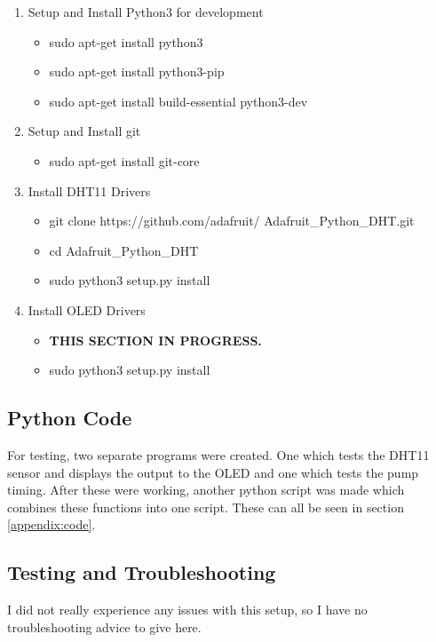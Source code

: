 \documentclass{article}
\begin{document}
\begin{multicols}{2}
		\begin{enumerate}
			\item Setup and Install Python3 for development
			\begin{itemize}
				\item sudo apt-get install python3
				\item sudo apt-get install python3-pip
				\item sudo apt-get install build-essential python3-dev
			\end{itemize}
			\item Setup and Install git
			\begin{itemize}
				\item sudo apt-get install git-core
			\end{itemize}
			\item Install DHT11 Drivers
			\begin{itemize}
				\item git clone https://github.com/adafruit/ Adafruit\_Python\_DHT.git
				\item cd Adafruit\_Python\_DHT
				\item sudo python3 setup.py install
			\end{itemize}
			\item Install OLED Drivers
			\begin{itemize}
				\item \textbf{THIS SECTION IN PROGRESS.}
				\item sudo python3 setup.py install
			\end{itemize}
		\end{enumerate}
		
		\subsection{Python Code}
		For testing, two separate programs were created. One which tests the DHT11 sensor and displays the output to the OLED and one which tests the pump timing. After these were working, another python script was made which combines these functions into one script. These can all be seen in section \ref{appendix:code}.
		
		\subsection{Testing and Troubleshooting}
		I did not really experience any issues with this setup, so I have no troubleshooting advice to give here.
		

\end{multicols}
\end{document}
